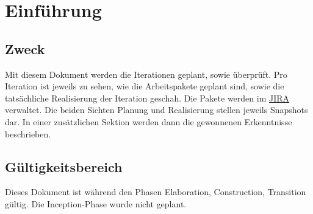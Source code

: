 \chapter{Einführung}
	\section{Zweck}
	Mit diesem Dokument werden die Iterationen geplant, sowie überprüft. Pro Iteration ist jeweils zu sehen, wie die Arbeitspakete geplant sind, sowie die tatsächliche Realisierung der Iteration geschah. Die Pakete werden im \href{http://sinv-56086.edu.hsr.ch:40010/}{JIRA} verwaltet. Die beiden Sichten Planung und Realisierung stellen jeweils Snapshots dar. In einer zusätzlichen Sektion werden dann die gewonnenen Erkenntnisse beschrieben.

	\section{Gültigkeitsbereich}
	Dieses Dokument ist während den Phasen Elaboration, Construction, Transition gültig. Die Inception-Phase wurde nicht geplant.